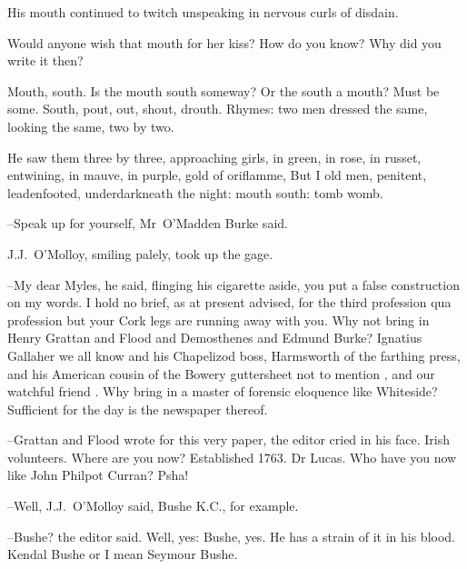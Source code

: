 His mouth continued to twitch unspeaking
in nervous curls of disdain.

Would anyone wish that mouth for her kiss?
How do you know?
Why did you write it then?



Mouth, south.
Is the mouth south someway?
Or the south a mouth?
Must be some.
South,
pout,
out,
shout,
drouth.
Rhymes:
two men dressed the same,
looking the same,
two by two.



He saw them three by three,
approaching girls,
in green,
in rose,
in russet,
entwining,
in mauve,
in purple,
gold of oriflamme,
But I old men,
penitent,
leadenfooted,
underdarkneath the night:
mouth south:
tomb womb.

--Speak up for yourself,
Mr~O'Madden Burke said.



J.J.~O'Molloy,
smiling palely,
took up the gage.

--My dear Myles,
he said,
flinging his cigarette aside,
you put a false construction on my words.
I hold no brief,
as at present advised,
for the third profession qua profession
but your Cork legs are running away with you.
Why not bring in Henry Grattan and Flood and Demosthenes and Edmund Burke?
Ignatius Gallaher we all know
and his Chapelizod boss, Harmsworth of the farthing press,
and his American cousin of the Bowery guttersheet
not to mention ,
and our watchful friend .
Why bring in a master of forensic eloquence like Whiteside?
Sufficient for the day is the newspaper thereof.



--Grattan and Flood wrote for this very paper,
the editor cried in his face.
Irish volunteers.
Where are you now?
Established 1763.
Dr Lucas.
Who have you now like John Philpot Curran?
Psha!

--Well,
J.J.~O'Molloy said,
Bushe K.C., for example.

--Bushe?
the editor said.
Well, yes:
Bushe, yes.
He has a strain of it in his blood.
Kendal Bushe or I mean Seymour Bushe.

